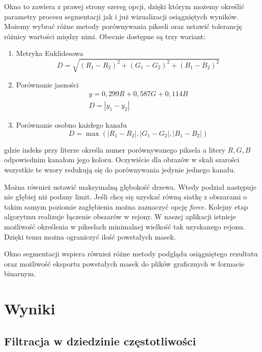 \documentclass{classrep}
\begin{document}
Okno to zawiera z prawej strony szereg opcji, dzięki którym możemy określić parametry procesu segmentacji jak i już wizualizacji osiągniętych wyników. Możemy wybrać różne metody porównywania pikseli oraz ustawić tolerancję różnicy wartości między nimi. Obecnie dostępne są trzy wariant: 
\begin{enumerate}
\item Metryka Euklidesowa
\begin{equation*}
D = \sqrt{(R_{1}-R_{2})^2+(G_{1}-G_{2})^2+(B_{1}-B_{2})^2}
\end{equation*}
\item Porównanie jasności
\begin{equation*}
\begin{array}{l}
y = 0,299R + 0,587G + 0,114B\\
D = |y_{1}-y_{2}|
\end{array}
\end{equation*}
\item Porównanie osobno każdego kanału
\begin{equation*}
D =\max\left(|R_{1}-R_{2}|, |G_{1}-G_{2}|, |B_{1}-B_{2}|\right)
\end{equation*}
\end{enumerate}
gdzie indeks przy literze określa numer porównywanego piksela a litery $R, G, B$ odpowiednim kanałom jego koloru. Oczywiście dla obrazów w skali szarości wszystkie te wzory redukują się do porównywania jedynie jednego kanału.

Można również ustawić maksymalną głębokość drzewa. Wtedy podział następuje nie głębiej niż podany limit. Jeśli chcę się uzyskać równą siatkę z obszarami o takim samym poziomie zagłębienia można zaznaczyć opcję \textit{force}. Kolejny etap algorytmu realizuje łączenie obszarów w rejony. W naszej aplikacji istnieje możliwość określenia w pikselach minimalnej wielkość tak uzyskanego rejonu. Dzięki temu można ograniczyć ilość powstałych masek.

Okno segmentacji wspiera również różne metody podglądu osiągniętego rezultatu oraz możliwość eksportu powstałych masek do plików graficznych w formacie binarnym. 

\section{Wyniki}

\subsection{Filtracja w dziedzinie częstotliwości}
\end{document}
